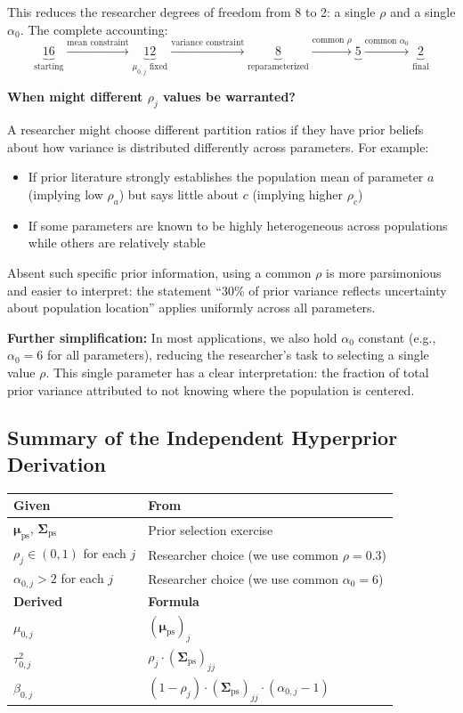 \documentclass[11pt]{article}
\begin{document}
This reduces the researcher degrees of freedom from 8 to 2: a single $\rho$ and a single $\alpha_0$. The complete accounting:
\[
  \underbrace{16}_{\text{starting}} \xrightarrow{\text{mean constraint}} \underbrace{12}_{\mu_{0,j} \text{ fixed}} \xrightarrow{\text{variance constraint}} \underbrace{8}_{\text{reparameterized}} \xrightarrow{\text{common } \rho} \underbrace{5}_{} \xrightarrow{\text{common } \alpha_0} \underbrace{2}_{\text{final}}
\]

\textbf{When might different $\rho_j$ values be warranted?}

A researcher might choose different partition ratios if they have prior beliefs about how variance is distributed differently across parameters. For example:
\begin{itemize}
  \item If prior literature strongly establishes the population mean of parameter $a$ (implying low $\rho_a$) but says little about $c$ (implying higher $\rho_c$)
  \item If some parameters are known to be highly heterogeneous across populations while others are relatively stable
\end{itemize}

Absent such specific prior information, using a common $\rho$ is more parsimonious and easier to interpret: the statement ``30\% of prior variance reflects uncertainty about population location'' applies uniformly across all parameters.

\textbf{Further simplification:} In most applications, we also hold $\alpha_0$ constant (e.g., $\alpha_0 = 6$ for all parameters), reducing the researcher's task to selecting a single value $\rho$. This single parameter has a clear interpretation: the fraction of total prior variance attributed to not knowing where the population is centered.

\subsection{Summary of the Independent Hyperprior Derivation}

\begin{center}
\begin{tabular}{ll}
\toprule
\textbf{Given} & \textbf{From} \\
\midrule
$\boldsymbol{\mu}_{\text{ps}}$, $\boldsymbol{\Sigma}_{\text{ps}}$ & Prior selection exercise \\
$\rho_j \in (0, 1)$ for each $j$ & Researcher choice (we use common $\rho = 0.3$) \\
$\alpha_{0,j} > 2$ for each $j$ & Researcher choice (we use common $\alpha_0 = 6$) \\
\midrule
\textbf{Derived} & \textbf{Formula} \\
\midrule
$\mu_{0,j}$ & $(\boldsymbol{\mu}_{\text{ps}})_j$ \\
$\tau_{0,j}^2$ & $\rho_j \cdot (\boldsymbol{\Sigma}_{\text{ps}})_{jj}$ \\
$\beta_{0,j}$ & $(1 - \rho_j) \cdot (\boldsymbol{\Sigma}_{\text{ps}})_{jj} \cdot (\alpha_{0,j} - 1)$ \\
\bottomrule
\end{tabular}
\end{center}
\end{document}
